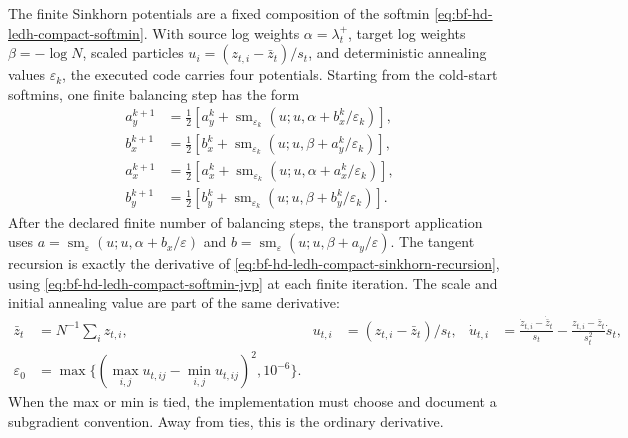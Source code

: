 The finite Sinkhorn potentials are a fixed composition of the softmin
\eqref{eq:bf-hd-ledh-compact-softmin}.  With source log weights
\(\alpha=\lambda^+_t\), target log weights \(\beta=-\log N\), scaled particles
\(u_i=(z_{t,i}-\bar z_t)/s_t\), and deterministic annealing values
\(\varepsilon_k\), the executed code carries four potentials.  Starting from
the cold-start softmins, one finite balancing step has the form
\begin{align}
  a_y^{k+1} &=\frac12\left[
    a_y^k+\operatorname{sm}_{\varepsilon_k}
      (u;u,\alpha+b_x^k/\varepsilon_k)\right],\\
  b_x^{k+1} &=\frac12\left[
    b_x^k+\operatorname{sm}_{\varepsilon_k}
      (u;u,\beta+a_y^k/\varepsilon_k)\right],\\
  a_x^{k+1} &=\frac12\left[
    a_x^k+\operatorname{sm}_{\varepsilon_k}
      (u;u,\alpha+a_x^k/\varepsilon_k)\right],\\
  b_y^{k+1} &=\frac12\left[
    b_y^k+\operatorname{sm}_{\varepsilon_k}
      (u;u,\beta+b_y^k/\varepsilon_k)\right].
  \label{eq:bf-hd-ledh-compact-sinkhorn-recursion}
\end{align}
After the declared finite number of balancing steps, the transport application
uses \(a=\operatorname{sm}_{\varepsilon}(u;u,\alpha+b_x/\varepsilon)\) and
\(b=\operatorname{sm}_{\varepsilon}(u;u,\beta+a_y/\varepsilon)\).
The tangent recursion is exactly the derivative of
\eqref{eq:bf-hd-ledh-compact-sinkhorn-recursion}, using
\eqref{eq:bf-hd-ledh-compact-softmin-jvp} at each finite iteration.  The scale
and initial annealing value are part of the same derivative:
\begin{align}
  \bar z_t &= N^{-1}\sum_i z_{t,i},&
  u_{t,i}&=(z_{t,i}-\bar z_t)/s_t,&
  \dot u_{t,i}
    &=\frac{\dot z_{t,i}-\dot{\bar z}_t}{s_t}
      -\frac{z_{t,i}-\bar z_t}{s_t^2}\dot s_t,\\
  \varepsilon_0&=\max\{(\max_{i,j}u_{t,ij}-\min_{i,j}u_{t,ij})^2,10^{-6}\}.
  \label{eq:bf-hd-ledh-compact-scale-epsilon-sensitivity}
\end{align}
When the max or min is tied, the implementation must choose and document a
subgradient convention.  Away from ties, this is the ordinary derivative.

